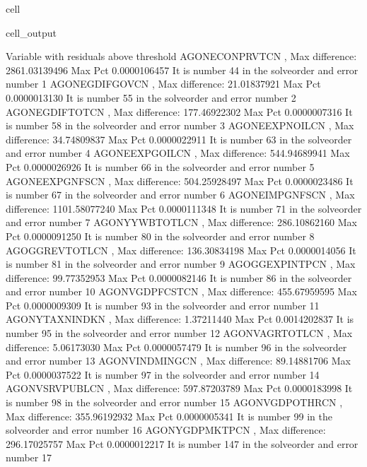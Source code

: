 \documentclass[letterpaper,10pt,english]{jupyterBook}
\begin{document}
\begin{sphinxuseclass}{cell}
\begin{sphinxVerbatimOutput}
\begin{sphinxuseclass}{cell_output}
\begin{sphinxVerbatim}[commandchars=\\\{\}]
Variable with residuals above threshold
AGONECONPRVTCN                        , Max difference:  2861.03139496 Max Pct    0.0000106457\PYGZpc{} It is number    44 in the solveorder and error number 1
AGONEGDIFGOVCN                        , Max difference:    21.01837921 Max Pct    0.0000013130\PYGZpc{} It is number    55 in the solveorder and error number 2
AGONEGDIFTOTCN                        , Max difference:   177.46922302 Max Pct    0.0000007316\PYGZpc{} It is number    58 in the solveorder and error number 3
AGONEEXPNOILCN                        , Max difference:    34.74809837 Max Pct    0.0000022911\PYGZpc{} It is number    63 in the solveorder and error number 4
AGONEEXPGOILCN                        , Max difference:   544.94689941 Max Pct    0.0000026926\PYGZpc{} It is number    66 in the solveorder and error number 5
AGONEEXPGNFSCN                        , Max difference:   504.25928497 Max Pct    0.0000023486\PYGZpc{} It is number    67 in the solveorder and error number 6
AGONEIMPGNFSCN                        , Max difference:  1101.58077240 Max Pct    0.0000111348\PYGZpc{} It is number    71 in the solveorder and error number 7
AGONYYWBTOTLCN                        , Max difference:   286.10862160 Max Pct    0.0000091250\PYGZpc{} It is number    80 in the solveorder and error number 8
AGOGGREVTOTLCN                        , Max difference:   136.30834198 Max Pct    0.0000014056\PYGZpc{} It is number    81 in the solveorder and error number 9
AGOGGEXPINTPCN                        , Max difference:    99.77352953 Max Pct    0.0000082146\PYGZpc{} It is number    86 in the solveorder and error number 10
AGONVGDPFCSTCN                        , Max difference:   455.67959595 Max Pct    0.0000009309\PYGZpc{} It is number    93 in the solveorder and error number 11
AGONYTAXNINDKN                        , Max difference:     1.37211440 Max Pct    0.0014202837\PYGZpc{} It is number    95 in the solveorder and error number 12
AGONVAGRTOTLCN                        , Max difference:     5.06173030 Max Pct    0.0000057479\PYGZpc{} It is number    96 in the solveorder and error number 13
AGONVINDMINGCN                        , Max difference:    89.14881706 Max Pct    0.0000037522\PYGZpc{} It is number    97 in the solveorder and error number 14
AGONVSRVPUBLCN                        , Max difference:   597.87203789 Max Pct    0.0000183998\PYGZpc{} It is number    98 in the solveorder and error number 15
AGONVGDPOTHRCN                        , Max difference:   355.96192932 Max Pct    0.0000005341\PYGZpc{} It is number    99 in the solveorder and error number 16
AGONYGDPMKTPCN                        , Max difference:   296.17025757 Max Pct    0.0000012217\PYGZpc{} It is number   147 in the solveorder and error number 17
\end{sphinxVerbatim}


\end{sphinxuseclass}
\end{sphinxVerbatimOutput}
\end{sphinxuseclass}
\end{document}
